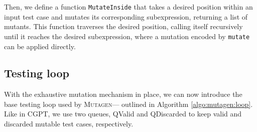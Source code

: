 \documentclass[sigconf,review,anonymous]{acmart}
\newcommand{\mutagen}{\textsc{Mutagen}\xspace}
\begin{document}
Then, we define a function \texttt{MutateInside} that takes a desired position
within an input test case and mutates its corresponding subexpression, returning
a list of mutants.
%
%
%
%
This function traverses the desired position, calling itself recursively until
it reaches the desired subexpression, where a mutation encoded by
\texttt{mutate} can be applied directly.
%


\subsection{Testing loop}

With the exhaustive mutation mechanism in place, we can now introduce the base
testing loop used by \mutagen --- outlined in Algorithm \ref{algo:mutagen:loop}.
%
Like in CGPT, we use two queues, QValid and QDiscarded to keep valid and
discarded mutable test cases, respectively.
%


\begin{algorithm}[t]
  \SetAlgoLined
  \DontPrintSemicolon
\caption{\label{algo:mutagen:loop}\mutagen Testing Loop}
\end{algorithm}
\end{document}
